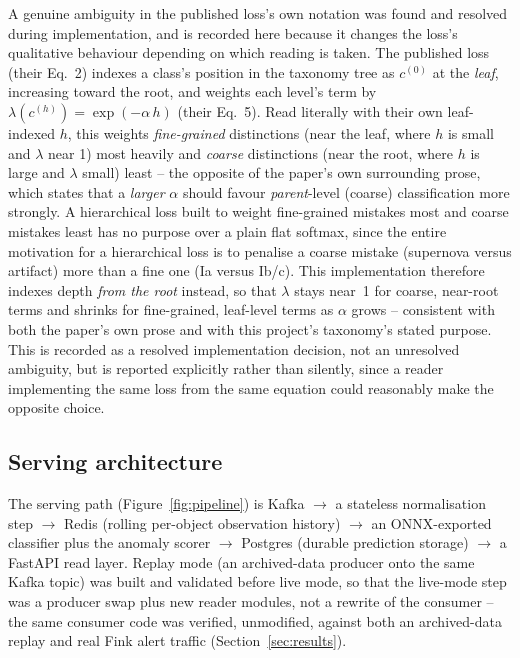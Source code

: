 A genuine ambiguity in the published loss's own notation was found and
resolved during implementation, and is recorded here because it changes the
loss's qualitative behaviour depending on which reading is taken. The
published loss (their Eq.~2) indexes a class's position in the taxonomy tree
as $c^{(0)}$ at the \emph{leaf}, increasing toward the root, and weights each
level's term by $\lambda(c^{(h)}) = \exp(-\alpha \, h)$ (their Eq.~5). Read
literally with their own leaf-indexed $h$, this weights \emph{fine-grained}
distinctions (near the leaf, where $h$ is small and $\lambda$ near 1) most
heavily and \emph{coarse} distinctions (near the root, where $h$ is large and
$\lambda$ small) least -- the opposite of the paper's own surrounding
prose, which states that a \emph{larger} $\alpha$ should favour
\emph{parent}-level (coarse) classification more strongly. A hierarchical
loss built to weight fine-grained mistakes most and coarse mistakes least
has no purpose over a plain flat softmax, since the entire motivation for a
hierarchical loss is to penalise a coarse mistake (supernova versus
artifact) more than a fine one (Ia versus Ib/c). This implementation
therefore indexes depth \emph{from the root} instead, so that $\lambda$ stays
near~1 for coarse, near-root terms and shrinks for fine-grained, leaf-level
terms as $\alpha$ grows -- consistent with both the paper's own prose and
with this project's taxonomy's stated purpose. This is recorded as a
resolved implementation decision, not an unresolved ambiguity, but is
reported explicitly rather than silently, since a reader implementing the
same loss from the same equation could reasonably make the opposite choice.

\subsection{Serving architecture}

The serving path (Figure~\ref{fig:pipeline}) is Kafka
$\to$ a stateless normalisation step $\to$ Redis (rolling per-object
observation history) $\to$ an ONNX-exported classifier plus the anomaly
scorer $\to$ Postgres (durable prediction storage) $\to$ a FastAPI read
layer. Replay mode (an archived-data producer onto the same Kafka topic) was
built and validated before live mode, so that the live-mode step was a
producer swap plus new reader modules, not a rewrite of the consumer -- the
same consumer code was verified, unmodified, against both an archived-data
replay and real Fink alert traffic (Section~\ref{sec:results}).

